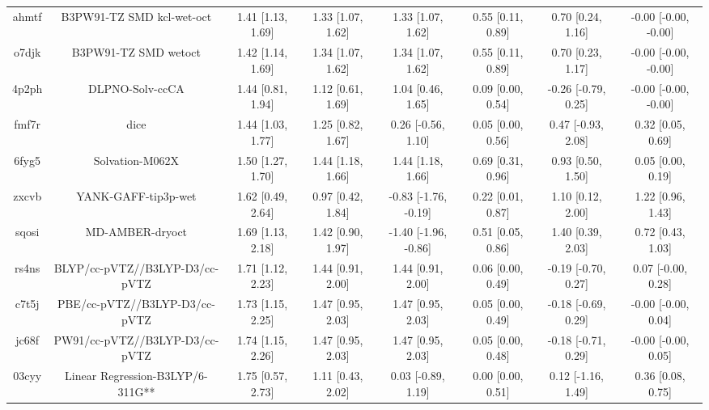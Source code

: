\documentclass{article}
\begin{document}
\begin{center}
\begin{longtable}{|cccccccc|}
 ahmtf &                          B3PW91-TZ SMD kcl-wet-oct &  1.41 [1.13, 1.69] &  1.33 [1.07, 1.62] &     1.33 [1.07, 1.62] &  0.55 [0.11, 0.89] &    0.70 [0.24, 1.16] &  -0.00 [-0.00, -0.00] \\
 o7djk &                               B3PW91-TZ SMD wetoct &  1.42 [1.14, 1.69] &  1.34 [1.07, 1.62] &     1.34 [1.07, 1.62] &  0.55 [0.11, 0.89] &    0.70 [0.23, 1.17] &  -0.00 [-0.00, -0.00] \\
 4p2ph &                                    DLPNO-Solv-ccCA &  1.44 [0.81, 1.94] &  1.12 [0.61, 1.69] &     1.04 [0.46, 1.65] &  0.09 [0.00, 0.54] &  -0.26 [-0.79, 0.25] &  -0.00 [-0.00, -0.00] \\
 fmf7r &                                               dice &  1.44 [1.03, 1.77] &  1.25 [0.82, 1.67] &    0.26 [-0.56, 1.10] &  0.05 [0.00, 0.56] &   0.47 [-0.93, 2.08] &     0.32 [0.05, 0.69] \\
 6fyg5 &                                    Solvation-M062X &  1.50 [1.27, 1.70] &  1.44 [1.18, 1.66] &     1.44 [1.18, 1.66] &  0.69 [0.31, 0.96] &    0.93 [0.50, 1.50] &     0.05 [0.00, 0.19] \\
 zxcvb &                                YANK-GAFF-tip3p-wet &  1.62 [0.49, 2.64] &  0.97 [0.42, 1.84] &  -0.83 [-1.76, -0.19] &  0.22 [0.01, 0.87] &    1.10 [0.12, 2.00] &     1.22 [0.96, 1.43] \\
 sqosi &                                    MD-AMBER-dryoct &  1.69 [1.13, 2.18] &  1.42 [0.90, 1.97] &  -1.40 [-1.96, -0.86] &  0.51 [0.05, 0.86] &    1.40 [0.39, 2.03] &     0.72 [0.43, 1.03] \\
 rs4ns &                     BLYP/cc-pVTZ//B3LYP-D3/cc-pVTZ &  1.71 [1.12, 2.23] &  1.44 [0.91, 2.00] &     1.44 [0.91, 2.00] &  0.06 [0.00, 0.49] &  -0.19 [-0.70, 0.27] &    0.07 [-0.00, 0.28] \\
 c7t5j &                      PBE/cc-pVTZ//B3LYP-D3/cc-pVTZ &  1.73 [1.15, 2.25] &  1.47 [0.95, 2.03] &     1.47 [0.95, 2.03] &  0.05 [0.00, 0.49] &  -0.18 [-0.69, 0.29] &   -0.00 [-0.00, 0.04] \\
 jc68f &                     PW91/cc-pVTZ//B3LYP-D3/cc-pVTZ &  1.74 [1.15, 2.26] &  1.47 [0.95, 2.03] &     1.47 [0.95, 2.03] &  0.05 [0.00, 0.48] &  -0.18 [-0.71, 0.29] &   -0.00 [-0.00, 0.05] \\
 03cyy &                   Linear Regression-B3LYP/6-311G** &  1.75 [0.57, 2.73] &  1.11 [0.43, 2.02] &    0.03 [-0.89, 1.19] &  0.00 [0.00, 0.51] &   0.12 [-1.16, 1.49] &     0.36 [0.08, 0.75] \\

\end{longtable}
\end{center}
\end{document}
